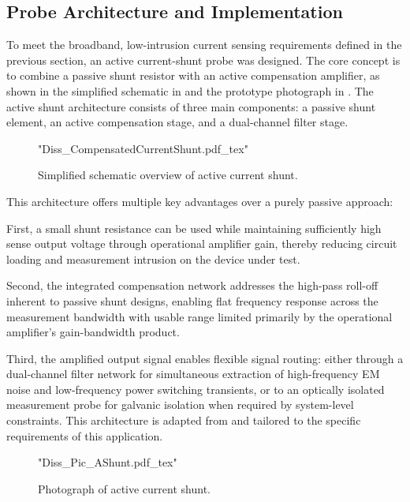 
\subsection{Probe Architecture and Implementation}

To meet the broadband, low-intrusion current sensing requirements defined in the previous section, an active current-shunt probe was designed. 
The core concept is to combine a passive shunt resistor with an active compensation amplifier, as shown in the simplified schematic in  and the prototype photograph in .
The active shunt architecture consists of three main components: a passive shunt element, an active compensation stage, and a dual-channel filter stage.

\begin{figure}[htbp]
	\centering
	{"Diss_CompensatedCurrentShunt.pdf_tex"}
	\caption{Simplified schematic overview of active current shunt.}\label{fig:ESBActiveShunt}
\end{figure}

This architecture offers multiple key advantages over a purely passive approach:

First, a small shunt resistance can be used while maintaining sufficiently high sense output voltage through operational amplifier gain, thereby reducing circuit loading and measurement intrusion on the device under test.

Second, the integrated compensation network addresses the high-pass roll-off inherent to passive shunt designs, enabling flat frequency response across the measurement bandwidth with usable range limited primarily by the operational amplifier's gain-bandwidth product.

Third, the amplified output signal enables flexible signal routing: either through a dual-channel filter network for simultaneous extraction of high-frequency EM noise and low-frequency power switching transients, or to an optically isolated measurement probe for galvanic isolation when required by system-level constraints.
This architecture is adapted from \cite{shillaber_gigahertz_2020,shillaber_ultrafast_2022} and tailored to the specific requirements of this application.

\begin{figure}[ht]
	\centering
	{"Diss_Pic_AShunt.pdf_tex"}
	\caption{Photograph of active current shunt.}\label{fig:ESBActiveShuntPhoto}
\end{figure}


